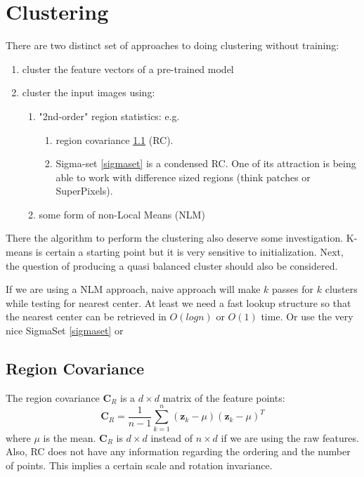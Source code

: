 \newpage
\section{Clustering}
There are two distinct set of approaches to doing clustering without training:
\begin{enumerate}
\item cluster the feature vectors of a pre-trained model
\item cluster the input images using:
  \begin{enumerate}
   \item "2nd-order" region statistics: e.g. 
	 \begin{enumerate}
		\item region covariance \ref{regcov} (RC).
		\item Sigma-set \ref{sigmaset} is a condensed RC. One of its attraction is
	    being able to work with difference sized regions (think patches or SuperPixels). 
	 \end{enumerate} 
   \item some form of non-Local Means (NLM)
\end{enumerate}
\end{enumerate}

There the algorithm to perform the clustering also deserve some investigation.
K-means is certain a starting point but it is very sensitive to initialization.
Next, the question of producing a quasi balanced cluster should also be considered.

If we are using a NLM approach, naive approach will make $k$ passes for $k$ clusters
while testing for nearest center. At least we need a fast lookup structure so 
that the nearest center can be retrieved in $O(logn)$ or $O(1)$ time.
Or use the very nice SigmaSet \ref{sigmaset} or \cite{Kwatra2010}

\subsection{Region Covariance}\label{regcov}
The region covariance $\mathbf{C}_R$ is a $d\times d$ matrix of the feature points:
\begin{equation}
 \mathbf{C}_R = \frac{1}{n-1}\sum\limits^n_{k=1}(\mathbf{z}_k - \mu) (\mathbf{z}_k - \mu)^T
\end{equation}
where $\mu$ is the mean. $\mathbf{C}_R$ is $d\times d$ instead of $n\times d$
if we are using the raw features. Also, RC does not have any information regarding
the ordering and the number of points. This implies a certain scale and rotation
invariance.

